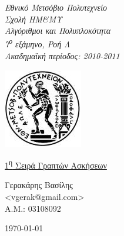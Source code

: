 \begin{titlepage}
\begin{center}

\noindent\begin{minipage}[b]{.55\textwidth}
\begin{Large}
\emph{Εθνικό Μετσόβιο Πολυτεχνείο\\
Σχολή ΗΜ\&ΜΥ\\
Αλγόριθμοι και Πολυπλοκότητα\\
7\textsuperscript{ο} εξάμηνο, Ροή Λ\\
Ακαδημαϊκή περίοδος: 2010-2011\\}
\end{Large}
\end{minipage}%
\begin{minipage}[b]{.45\textwidth}
     \centering
     \includegraphics[scale=0.8]{title/ntua_logo}
\end{minipage}

\vspace{5cm}
\begin{huge}
\underline{1\textsuperscript{η} Σειρά Γραπτών Ασκήσεων}
\end{huge}
\vfill

\begin{flushright}
\Large{Γερακάρης Βασίλης}\\
\large{<vgerak@gmail.com> }\\
\large{Α.Μ.: 03108092}\\
\end{flushright}
\vspace{1cm}

\large\today\\
\end{center}
\end{titlepage}

